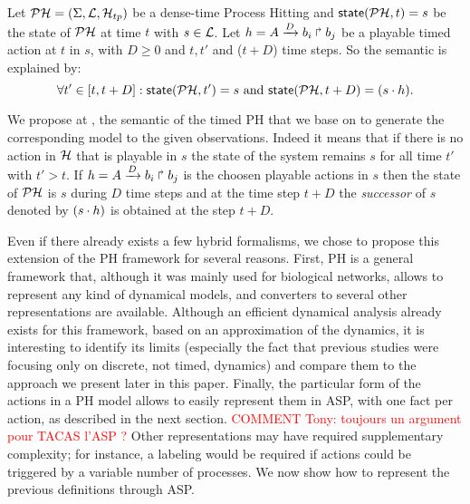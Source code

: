 \begin{definition}
\label{def:semantic}
Let $\mathcal{PH} = (\Sigma,\mathcal{L},\mathcal{H}_{tp})$ be a dense-time Process Hitting and $\textsf{state}(\mathcal{PH}, t)=s$ be the state of $\mathcal{PH}$ at time $t$ with $s \in \mathcal{L}$. Let $h = A\xrightarrow{D} b_i \Rsh b_j$ be a playable timed action at $t$ in $s$, with $D \geq 0 $ and $t, t'$ and ($t+D$) time steps. So the semantic is explained by:
$$ \forall t' \in [t, t+D ] : \textsf{state}(\mathcal{PH}, t')=s \text{ and } \textsf{state}(\mathcal{PH}, t+D)=(s \cdot h).$$
\end{definition}

We propose at , the semantic of the timed PH that we base on to generate the corresponding model to the given observations. Indeed it means that if there is no action in $\mathcal{H}$ that is playable in $s$ the state of the system remains $s$ for all time $t'$ with $t' > t$.%
If $h = A\xrightarrow{D} b_i \Rsh b_j$ is the choosen playable actions in $s$ then the state of $\mathcal{PH}$ is $s$ during $D$ time steps and at the time step $t+D$
the \emph{successor} of $s$ denoted by $(s \cdot h)$ is obtained at the step $t+D$.

Even if there already exists a few hybrid formalisms, we chose to propose this extension of the PH framework for several reasons.
First, PH is a general framework that,
although it was mainly used for biological networks,
allows to represent any kind of dynamical models,
and converters to several other representations are available. %
Although an efficient dynamical analysis already exists for this framework,
based on an approximation of the dynamics,
it is interesting to identify its limits (especially the fact that previous studies were focusing only on discrete, not timed, dynamics)
and compare them to the approach we present later in this paper.
Finally, the particular form of the actions in a  PH model allows
to easily represent them in ASP,
with one fact per action, as described in the next section.
\textcolor{red}{COMMENT Tony: toujours un argument pour TACAS l'ASP ?}
Other representations may have required supplementary complexity;
for instance, a labeling would be required
if actions could be triggered by a variable number of processes.
We now show how to represent the previous definitions through ASP.

